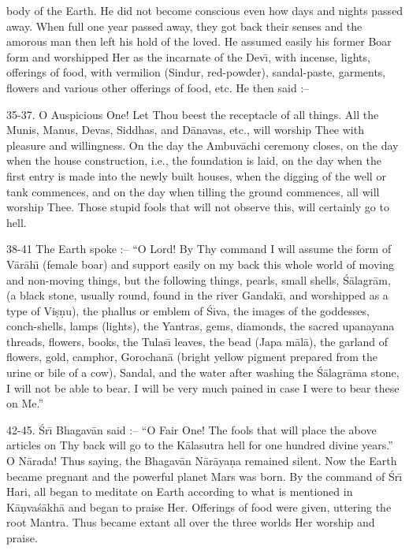 body of the Earth. He did not become conscious even how days and nights passed away. When full one year passed away, they got back their senses and the amorous man then left his hold of the loved. He assumed easily his former Boar form and worshipped Her as the incarnate of the Dev\={\i}, with incense, lights, offerings of food, with vermilion (Sindur, red-powder), sandal-paste, garments, flowers and various other offerings of food, etc. He then said :--

35-37. O Auspicious One! Let Thou beest the receptacle of all things. All the Munis, Manus, Devas, Siddhas, and D\=anavas, etc., will worship Thee with pleasure and willingness. On the day the Ambuv\=achi ceremony closes, on the day when the house construction, i.e., the foundation is laid, on the day when the first entry is made into the newly built houses, when the digging of the well or tank commences, and on the day when tilling the ground commences, all will worship Thee. Those stupid fools that will not observe this, will certainly go to hell.

38-41 The Earth spoke :-- ``O Lord! By Thy command I will assume the form of V\=ar\=ah\={\i} (female boar) and support easily on my back this whole world of moving and non-moving things, but the following things, pearls, small shells, \'S\=alagr\=am, (a black stone, usually round, found in the river Gandak\={\i}, and worshipped as a type of Vi\d{s}\d{n}u), the phallus or emblem of \'Siva, the images of the goddesses, conch-shells, lamps (lights), the Yantras, gems, diamonds, the sacred upanayana threads, flowers, books, the Tulas\={\i} leaves, the bead (Japa m\=al\=a), the garland of flowers, gold, camphor, Gorochan\=a (bright yellow pigment prepared from the urine or bile of a cow), Sandal, and the water after washing the \'S\=alagr\=ama stone, I will not be able to bear. I will be very much pained in case I were to bear these on Me.''

42-45. \'Sr\={\i} Bhagav\=an said :-- ``O Fair One! The fools that will place the above articles on Thy back will go to the K\=alasutra hell for one hundred divine years.'' O N\=arada! Thus saying, the Bhagav\=an N\=ar\=aya\d{n}a remained silent. Now the Earth became pregnant and the powerful planet Mars was born. By the command of \'Sr\={\i} Hari, all began to meditate on Earth according to what is mentioned in K\=a\d{n}va\'s\=akh\=a and began to praise Her. Offerings of food were given, uttering the root Mantra. Thus became extant all over the three worlds Her worship and praise.


